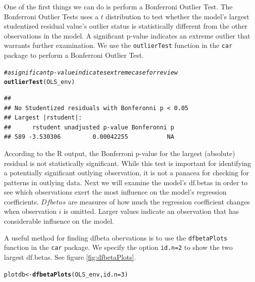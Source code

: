 \documentclass[11pt,openany]{book}\usepackage[]{graphicx}\usepackage[]{color}
\makeatletter
\newcommand{\hlnum}[1]{\textcolor[rgb]{0.686,0.059,0.569}{#1}}%
\newcommand{\hlcom}[1]{\textcolor[rgb]{0.678,0.584,0.686}{\textit{#1}}}%
\newcommand{\hlstd}[1]{\textcolor[rgb]{0.345,0.345,0.345}{#1}}%
\newcommand{\hlkwb}[1]{\textcolor[rgb]{0.69,0.353,0.396}{#1}}%
\newcommand{\hlkwc}[1]{\textcolor[rgb]{0.333,0.667,0.333}{#1}}%
\newcommand{\hlkwd}[1]{\textcolor[rgb]{0.737,0.353,0.396}{\textbf{#1}}}%
\newenvironment{kframe}{%
 \def\at@end@of@kframe{}%
 \ifinner\ifhmode%
  \def\at@end@of@kframe{\end{minipage}}%
  \begin{minipage}{\columnwidth}%
 \fi\fi%
 \def\FrameCommand##1{\hskip\@totalleftmargin \hskip-\fboxsep
 \colorbox{shadecolor}{##1}\hskip-\fboxsep
     \hskip-\linewidth \hskip-\@totalleftmargin \hskip\columnwidth}%
 \MakeFramed {\advance\hsize-\width
   \@totalleftmargin\z@ \linewidth\hsize
   \@setminipage}}%
 {\par\unskip\endMakeFramed%
 \at@end@of@kframe}
\newenvironment{knitrout}{}{} %
\renewenvironment{knitrout}{\begin{singlespace}}{\end{singlespace}}
\makeatother
\begin{document}
One of the first things we can do is perform a Bonferroni Outlier Test. The Bonferroni Outlier Tests uses a $t$ distribution to test whether the model's largest studentized residual value's outlier status is statistically different from the other observations in the model.  A significant p-value indicates an extreme outlier that warrants further examination.  We use the \texttt{outlierTest} function in the \texttt{car} package to perform a Bonferroni Outlier Test.

\begin{knitrout}
\color{fgcolor}\begin{kframe}
\begin{alltt}
\hlcom{# a significant p-value indicates extreme case for review}
\hlkwd{outlierTest}\hlstd{(OLS_env)}
\end{alltt}
\begin{verbatim}
## 
## No Studentized residuals with Bonferonni p < 0.05
## Largest |rstudent|:
##      rstudent unadjusted p-value Bonferonni p
## 589 -3.530306         0.00042255           NA
\end{verbatim}
\end{kframe}
\end{knitrout}

According to the R output, the Bonferroni p-value for the largest (absolute) residual is not statistically significant.  While this test is important for identifying a potentially significant outlying  observation, it is not a panacea for checking for patterns in outlying data.  Next we will examine the model's df.betas in order to see which observations exert the most influence on the model's regression coefficients. $Dfbetas$ are measures of how much the regression coefficient changes when observation $i$ is omitted.  Larger values indicate an observation that has considerable influence on the model.   

A useful method for finding dfbeta obervations is to use the \texttt{dfbetaPlots} function in the \texttt{car} package.  We specify the option \texttt{id.n=2} to show the two largest df.betas.  See figure \ref{fig:dfbetaPlots}.

\begin{knitrout}
\color{fgcolor}\begin{kframe}
\begin{alltt}
\hlstd{plotdb} \hlkwb{<-} \hlkwd{dfbetaPlots}\hlstd{(OLS_env,} \hlkwc{id.n} \hlstd{=} \hlnum{3}\hlstd{)}
\end{alltt}
\end{kframe}
\end{knitrout}
\end{document}
